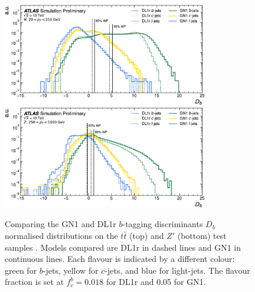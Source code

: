 \begin{figure}[h!]
  \centering
  \includegraphics[width=0.8\textwidth]{Images/FTAG/GN/GN1/eff/ttb.png}
  \includegraphics[width=0.8\textwidth]{Images/FTAG/GN/GN1/eff/zpb.png}
  \caption{Comparing the GN1 and DL1r $b$-tagging discriminants $D_b$ normalised distributions on the $t\bar{t}$ (top) and $Z'$ (bottom) test samples \cite{ATL-PHYS-PUB-2022-027}. Models compared are DL1r in dashed lines and GN1 in continuous lines. Each flavour is indicated by a different colour: green for $b$-jets, yellow for $c$-jets, and blue for light-jets. The flavour fraction is set at $f^b_c = 0.018$ for DL1r and 0.05 for GN1.}
  \label{fig:GN1disb}
\end{figure} 

